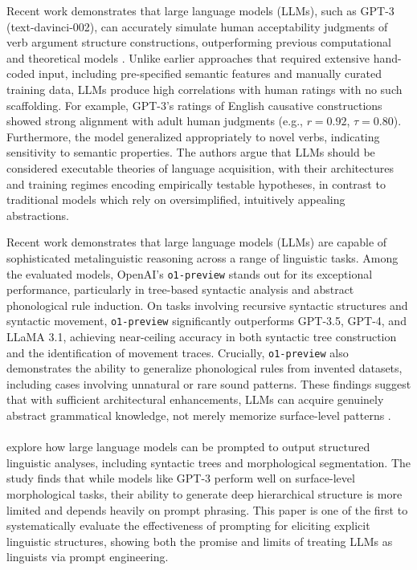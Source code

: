 Recent work demonstrates that large language models (LLMs), such as GPT-3 (text-davinci-002), can accurately simulate human acceptability judgments of verb argument structure constructions, outperforming previous computational and theoretical models \citep{ambridge2024}. Unlike earlier approaches that required extensive hand-coded input, including pre-specified semantic features and manually curated training data, LLMs produce high correlations with human ratings with no such scaffolding. For example, GPT-3’s ratings of English causative constructions showed strong alignment with adult human judgments (e.g., $r = 0.92$, $\tau = 0.80$). Furthermore, the model generalized appropriately to novel verbs, indicating sensitivity to semantic properties. The authors argue that LLMs should be considered executable theories of language acquisition, with their architectures and training regimes encoding empirically testable hypotheses, in contrast to traditional models which rely on oversimplified, intuitively appealing abstractions.

Recent work demonstrates that large language models (LLMs) are capable of sophisticated metalinguistic reasoning across a range of linguistic tasks. Among the evaluated models, OpenAI's \texttt{o1-preview} stands out for its exceptional performance, particularly in tree-based syntactic analysis and abstract phonological rule induction. On tasks involving recursive syntactic structures and syntactic movement, \texttt{o1-preview} significantly outperforms GPT-3.5, GPT-4, and LLaMA 3.1, achieving near-ceiling accuracy in both syntactic tree construction and the identification of movement traces. Crucially, \texttt{o1-preview} also demonstrates the ability to generalize phonological rules from invented datasets, including cases involving unnatural or rare sound patterns. These findings suggest that with sufficient architectural enhancements, LLMs can acquire genuinely abstract grammatical knowledge, not merely memorize surface-level patterns \citep{begus2025}.

\paragraph{} \citet{blevins2023prompting} explore how large language models can be prompted to output structured linguistic analyses, including syntactic trees and morphological segmentation. The study finds that while models like GPT-3 perform well on surface-level morphological tasks, their ability to generate deep hierarchical structure is more limited and depends heavily on prompt phrasing. This paper is one of the first to systematically evaluate the effectiveness of prompting for eliciting explicit linguistic structures, showing both the promise and limits of treating LLMs as linguists via prompt engineering.

